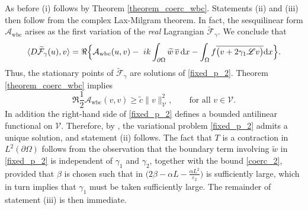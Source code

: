 \documentclass[twoside,11pt]{article}
\def\d{{\mathrm d}}
\def\L{{\mathscr{L}}}
\def\vbar{\overline{v}}
\def\Vc{{\mathscr V}}
\def\L{{\mathscr{L}}}
\begin{document}
{As before (i) follows by Theorem \ref{theorem_coerc_wbc}.    Statements (ii) and (iii) then follow from the {complex} Lax-Milgram theorem. In fact,   the sesquilinear form $ \mathcal{A}_{\text{wbc}} $  arises as the first variation of the \emph{real} Lagrangian $\widetilde {\mathcal{F}}_{\gamma} $.
We conclude that
\begin{equation}\label{Energy_H_gamma_Re_2_wbc}
\begin{split}
\langle D\widetilde {\mathcal{F}}_{\gamma}(u), v \rangle
= \Re \Bigl\{ \mathcal{A}_{\text{wbc}}(u,v)  -   \ {ik} \int_{\partial \Omega}\widetilde w \, \vbar \,  \d x - \int_{\Omega} f  \overline{\bigl(v + 2\gamma_1 \L v\bigr)}  \d x \Bigr\}.
\end{split}
\end{equation}
Thus, the stationary points of $\widetilde {\mathcal{F}}_{\gamma} $ are solutions of \eqref{fixed_p_2}. 
Theorem \ref{theorem_coerc_wbc} implies
\begin{equation}\label{Energy_H_gamma_Re_4_wbc}
\Re  \frac{1}{2} \mathcal{A}_{\text{wbc}}(v,v) 
 \ge  \tilde c  \|v\|_{\Vc}^{2},
\qquad \text{for all } v\in \Vc .
\end{equation}
In addition the right-hand side of  \eqref{fixed_p_2} defines a bounded antilinear functional on $\Vc$. {Therefore, by \cite[Section~1, Chapter~VII]{Dautray_Lions_v2_1988}, the variational problem \eqref{fixed_p_2} admits a unique solution, and statement (ii) follows.} 
The fact that $T$ is a contraction in $L^2(\partial \Omega)$ follows from the observation that the boundary term involving $\widetilde w$ in \eqref{fixed_p_2} is independent of $\gamma_1$ and $\gamma_2$, together with the bound \eqref{coerc_2}, provided that $\beta$ is chosen such that
in $\Big(2\beta - \alpha L - \frac{\alpha L^2}{\varepsilon_2}\Big)$
is sufficiently large, which in turn implies that $\gamma_1$ must be taken sufficiently large. The remainder of statement (iii) is then immediate.

 



}
\end{document}
